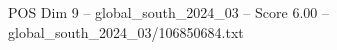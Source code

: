 \begin{textsample}{POS Dim 9 – global\_south\_2024\_03 – Score 6.00 – global\_south\_2024\_03/106850684.txt}
\end{textsample}
